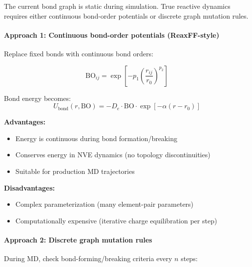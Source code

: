 \documentclass[11pt]{article}
\begin{document}
The current bond graph is static during simulation. True reactive dynamics requires either continuous bond-order potentials or discrete graph mutation rules.

\paragraph{Approach 1: Continuous bond-order potentials (ReaxFF-style)}

Replace fixed bonds with continuous bond orders:

\begin{equation}
\text{BO}_{ij} = \exp\left[-p_1 \left(\frac{r_{ij}}{r_0}\right)^{p_2}\right]
\end{equation}

Bond energy becomes:
\begin{equation}
U_{\text{bond}}(r, \text{BO}) = -D_e \cdot \text{BO} \cdot \exp[-\alpha(r - r_0)]
\end{equation}

\textbf{Advantages:}
\begin{itemize}
\item Energy is continuous during bond formation/breaking
\item Conserves energy in NVE dynamics (no topology discontinuities)
\item Suitable for production MD trajectories
\end{itemize}

\textbf{Disadvantages:}
\begin{itemize}
\item Complex parameterization (many element-pair parameters)
\item Computationally expensive (iterative charge equilibration per step)
\end{itemize}

\paragraph{Approach 2: Discrete graph mutation rules}

During MD, check bond-forming/breaking criteria every $n$ steps:
\end{document}
